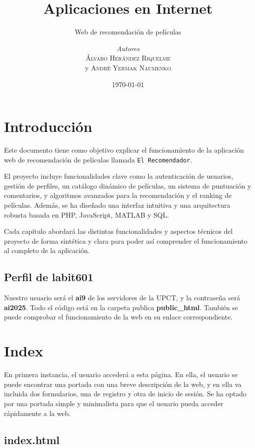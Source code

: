\documentclass[a4paper, 12pt]{report}
\institute{Universidad Politécnica de Cartagena}
\title{Aplicaciones en Internet}
\subtitle{Web de recomendación de películas}
\author{\textit{Autores}\\\textsc{Álvaro Herández Riquelme}\\ y \textsc{André Yermak Naumenko}}
\date{\today}
\begin{document}
    \maketitle
    \romantableofcontents



    \newpage
    \newpage

    \chapter{Introducción}
    Este documento tiene como objetivo explicar el funcionamiento de la aplicación web de recomendación de películas llamada \texttt{El Recomendador}.

    El proyecto incluye funcionalidades clave como la autenticación de usuarios, gestión de perfiles, un catálogo dinámico de películas, un sistema de puntuación y comentarios, y algoritmos avanzados para la recomendación y el ranking de películas. Además, se ha diseñado una interfaz intuitiva y una arquitectura robusta basada en PHP, JavaScript, MATLAB y SQL.

    Cada capítulo abordará las distintas funcionalidades y aspectos técnicos del proyecto de forma sintética y clara para poder así comprender el funcionamiento al completo de la aplicación.

    \section{Perfil de labit601}

    Nuestro usuario será el \textbf{ai9} de los servidores de la UPCT, y la contraseña será \textbf{ai2025}. Todo el código está en la carpeta publica \textbf{public\_html}. También se puede comprobar el funcionamiento de la web en su enlace correspondiente.
    \chapter{Index}

    En primera instancia, el usuario accederá a esta página. En ella, el usuario se puede encontrar una portada con una breve descripción de la web, y en ella va incluida dos formularios, una de registro y otra de inicio de sesión. Se ha optado por una portada simple y minimalista para que el usuario pueda acceder rápidamente a la web.
    \section{index.html}
\end{document}
